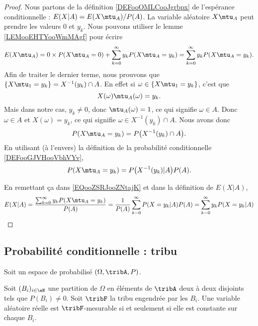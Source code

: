 \begin{proof}
	Nous partons de la définition \ref{DEFooOMLCooJgrbpx} de l'espérance conditionnelle : \( E(X|A)=E(X\mtu_A)/P(A)\). La variable aléatoire \( X\mtu_A\) peut prendre les valeurs \( 0\) et  \( y_k\). Nous pouvons utiliser le lemme \ref{LEMooEHTYooWmMAgf} pour écrire
	\begin{equation}        \label{EQooZSRJooZNtajK}
		E(X\mtu_A)=0\times P(X\mtu_A=0)+\sum_{k=0}^{\infty}y_kP(X\mtu_A=y_k)=\sum_{k=0}^{\infty}y_kP(X\mtu_A=y_k).
	\end{equation}
	Afin de traiter le dernier terme, nous prouvons que \( \{ X\mtu_1=y_k \}=X^{-1}(y_k)\cap A\). En effet si \( \omega\in\{ X\mtu_1=y_k \}\), c'est que
	\begin{equation}
		X(\omega)\mtu_A(\omega)=y_k.
	\end{equation}
	Mais dans notre cas, \( y_k\neq 0\), donc \( \mtu_A(\omega)=1\), ce qui signifie \( \omega\in A\). Donc \( \omega\in A\) et \( X(\omega)=y_k\), ce qui signifie \( \omega\in X^{-1}(y_k)\cap A\). Nous avons donc
	\begin{equation}
		P(X\mtu_A=y_k)=P\big( X^{-1}(y_k)\cap A \big).
	\end{equation}
	En utilisant (à l'envers) la définition de la probabilité conditionnelle \ref{DEFooGJVHooVbhVYv},
	\begin{equation}
		P(X\mtu_A=y_k)=P\big( X^{-1}(y_k)|A \big)P(A).
	\end{equation}

	En remettant ça dans \eqref{EQooZSRJooZNtajK} et dans la définition de \( E(X|A)\),
	\begin{equation}
		E(X|A)=\frac{\sum_{k=0}^{\infty}y_kP(X\mtu_A=y_k)}{P(A)}=\frac{1}{ P(A) }\sum_{k=0}^{\infty}P(X=y_k|A)P(A)=\sum_{k=0}^{\infty}y_kP(X=y_k|A)
	\end{equation}
\end{proof}

\subsection{Probabilité conditionnelle : tribu}

Soit un espace de probabilisé \( (\Omega,\tribA,P)\).

\begin{lemma}       \label{LEMooXXTYooZCXiYr}
	Soit \( (B_i)_{i\in\eN}\) une partition de \( \Omega\) en éléments de \( \tribA\) deux à deux disjoints tels que \( P(B_i)\neq 0\). Soit \( \tribF\) la tribu engendrée par les \( B_i\). Une variable aléatoire réelle est \( \tribF\)-mesurable si et seulement si elle est constante sur chaque \( B_i\).
\end{lemma}

